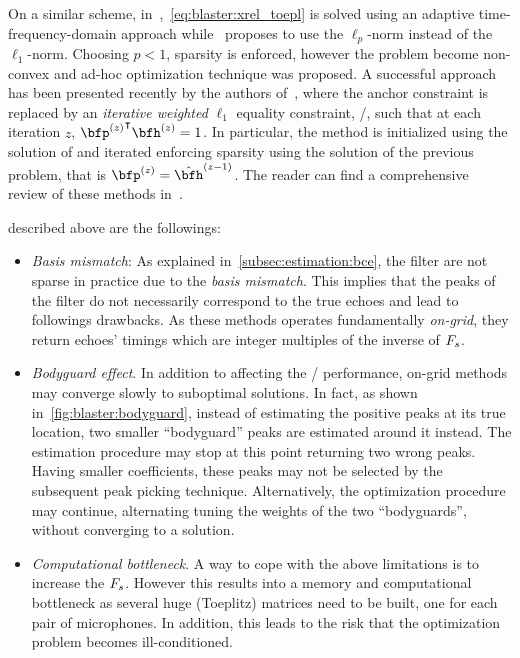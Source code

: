 \mynewline
On a similar scheme, in~,~\cref{eq:blaster:xrel_toepl} is solved using an adaptive time-frequency-domain approach while~ proposes to use the $\ell_p$-norm instead of the $\ell_1$-norm.
Choosing $p < 1$, sparsity is enforced, however the problem become non-convex and ad-hoc optimization technique was proposed.
A successful approach has been presented recently by the authors of~, where the anchor constraint is replaced by an \textit{iterative weighted} $\ell_1$ equality constraint, \ie/, such that at each iteration $z$, $\ktranspose{\bfp^{(z)}}\bfh^{(z)} = 1$.
In particular, the method is initialized using the solution of  and iterated enforcing sparsity using the solution of the previous problem, that is $\bfp^{(z)} = \hat{\bfh}^{(z-1)}$.
The reader can find a comprehensive review of these methods in~.

 described above are the followings:
\begin{itemize}
    \item \textit{Basis mismatch}: As explained in~\cref{subsec:estimation:bce}, the filter are not sparse in practice due to the \textit{basis mismatch}.
    This implies that the peaks of the filter do not necessarily correspond to the true echoes and lead to followings drawbacks.
    As these methods operates fundamentally \textit{on-grid}, they return echoes' timings which are integer multiples of the inverse of $F_s$.
    \item \textit{Bodyguard effect}.
    In addition to affecting the \AER/ performance, on-grid methods may converge slowly to suboptimal solutions.
    In fact, as shown in~\cref{fig:blaster:bodyguard}, instead of estimating the positive peaks at its true location, two smaller ``bodyguard'' peaks are estimated around it instead.
    The estimation procedure may stop at this point returning two wrong peaks.
    Having smaller coefficients, these peaks may not be selected by the subsequent peak picking technique.
    Alternatively, the optimization procedure may continue, alternating tuning the weights of the two ``bodyguards'', without converging to a solution.
    \item \textit{Computational bottleneck}.
    A way to cope with the above limitations is to increase the $F_s$.
    However this results into a memory and computational bottleneck as several huge (Toeplitz) matrices need to be built, one for each pair of microphones.
    In addition, this leads to the risk that the optimization problem becomes ill-conditioned.
\end{itemize}

